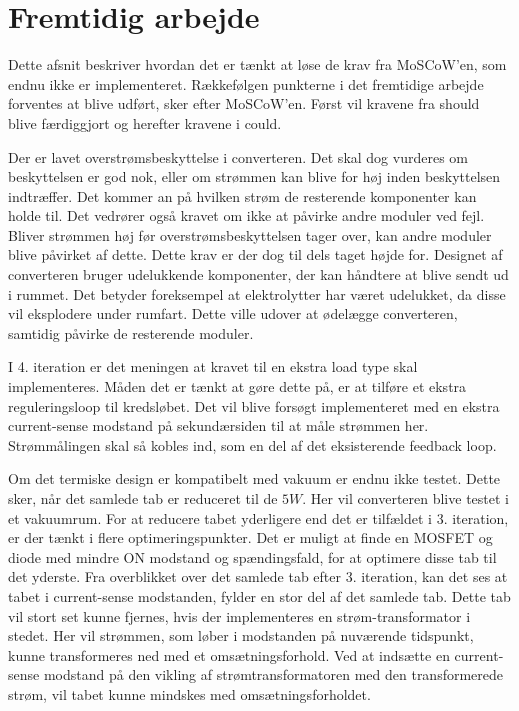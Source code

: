 \chapter{Fremtidig arbejde} \label{future}
Dette afsnit beskriver hvordan det er tænkt at løse de krav fra MoSCoW'en, som endnu ikke er implementeret. Rækkefølgen punkterne i det fremtidige arbejde forventes at blive udført, sker efter MoSCoW'en. Først vil kravene fra should blive færdiggjort og herefter kravene i could.  

Der er lavet overstrømsbeskyttelse i converteren. Det skal dog vurderes om beskyttelsen er god nok, eller om strømmen kan blive for høj inden beskyttelsen indtræffer. Det kommer an på hvilken strøm de resterende komponenter kan holde til. Det vedrører også kravet om ikke at påvirke andre moduler ved fejl. Bliver strømmen høj før overstrømsbeskyttelsen tager over, kan andre moduler blive påvirket af dette. Dette krav er der dog til dels taget højde for. Designet af converteren bruger udelukkende komponenter, der kan håndtere at blive sendt ud i rummet. Det betyder foreksempel at elektrolytter har været udelukket, da disse vil eksplodere under rumfart. Dette ville udover at ødelægge converteren, samtidig påvirke de resterende moduler.

I 4. iteration er det meningen at kravet til en ekstra load type skal implementeres. Måden det er tænkt at gøre dette på, er at tilføre et ekstra reguleringsloop til kredsløbet. Det vil blive forsøgt implementeret med en ekstra current-sense modstand på sekundærsiden til at måle strømmen her. Strømmålingen skal så kobles ind, som en del af det eksisterende feedback loop.

Om det termiske design er kompatibelt med vakuum er endnu ikke testet. Dette sker, når det samlede tab er reduceret til de $5W$. Her vil converteren blive testet i et vakuumrum. For at reducere tabet yderligere end det er tilfældet i 3. iteration, er der tænkt i flere optimeringspunkter. Det er muligt at finde en MOSFET og diode med mindre ON modstand og spændingsfald, for at optimere disse tab til det yderste. 
Fra overblikket over det samlede tab efter 3. iteration, kan det ses at tabet i current-sense modstanden, fylder en stor del af det samlede tab. Dette tab vil stort set kunne fjernes, hvis der implementeres en strøm-transformator i stedet. Her vil strømmen, som løber i modstanden på nuværende tidspunkt, kunne transformeres ned med et omsætningsforhold. Ved at indsætte en current-sense modstand på den vikling af strømtransformatoren med den transformerede strøm, vil tabet kunne mindskes med omsætningsforholdet.  

